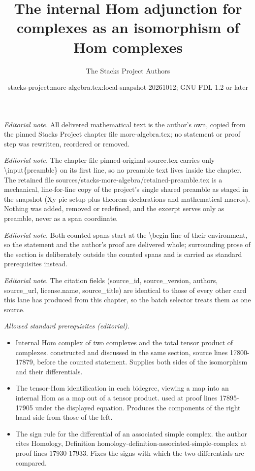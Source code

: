 \documentclass[10pt,a4paper]{amsart}
\title{The internal Hom adjunction for complexes as an isomorphism of Hom complexes}
\author{The Stacks Project Authors}
\date{stacks-project:more-algebra.tex:local-snapshot-20261012; GNU FDL 1.2 or later}
\theoremstyle{plain}
\theoremstyle{definition}
\theoremstyle{remark}
\numberwithin{equation}{subsection}
\begin{document}
\maketitle
\setcounter{subsection}{1}
\noindent\textit{Editorial note.} All delivered mathematical text is the author's own, copied from the pinned Stacks Project chapter file more-algebra.tex; no statement or proof step was rewritten, reordered or removed.\par\medskip
\noindent\textit{Editorial note.} The chapter file pinned-original-source.tex carries only \textbackslash{}input\{preamble\} on its first line, so no preamble text lives inside the chapter. The retained file sources/stacks-more-algebra/retained-preamble.tex is a mechanical, line-for-line copy of the project's single shared preamble as staged in the snapshot (Xy-pic setup plus theorem declarations and mathematical macros). Nothing was added, removed or redefined, and the excerpt serves only as preamble, never as a span coordinate.\par\medskip
\noindent\textit{Editorial note.} Both counted spans start at the \textbackslash{}begin line of their environment, so the statement and the author's proof are delivered whole; surrounding prose of the section is deliberately outside the counted spans and is carried as standard prerequisites instead.\par\medskip
\noindent\textit{Editorial note.} The citation fields (source\_id, source\_version, authors, source\_url, license.name, source\_title) are identical to those of every other card this lane has produced from this chapter, so the batch selector treats them as one source.\par\medskip
\noindent\textit{Allowed standard prerequisites (editorial).}\begin{itemize}
\item Internal Hom complex of two complexes and the total tensor product of complexes. constructed and discussed in the same section, source lines 17800-17879, before the counted statement. Supplies both sides of the isomorphism and their differentials.
\item The tensor-Hom identification in each bidegree, viewing a map into an internal Hom as a map out of a tensor product. used at proof lines 17895-17905 under the displayed equation. Produces the components of the right hand side from those of the left.
\item The sign rule for the differential of an associated simple complex. the author cites Homology, Definition homology-definition-associated-simple-complex at proof lines 17930-17933. Fixes the signs with which the two differentials are compared.
\end{itemize}\medskip
\end{document}
